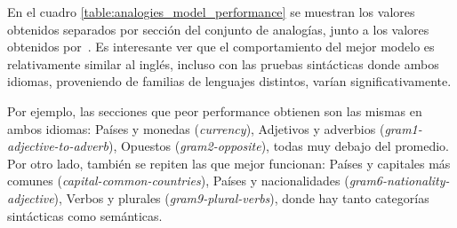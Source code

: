 En el cuadro \ref{table:analogies_model_performance} se muestran los valores obtenidos separados
por sección del conjunto de analogías, junto a los valores obtenidos por~\cite{Levy2014b}. Es
interesante ver que el comportamiento del mejor modelo es relativamente similar al inglés, incluso
con las pruebas sintácticas donde ambos idiomas, proveniendo de familias de lenguajes distintos,
varían significativamente.

Por ejemplo, las secciones que peor performance obtienen son las mismas en ambos idiomas: Países y
monedas (\textit{currency}), Adjetivos y adverbios (\textit{gram1-adjective-to-adverb}), Opuestos
(\textit{gram2-opposite}), todas muy debajo del promedio. Por otro lado, también se repiten las que
mejor funcionan: Países y capitales más comunes (\textit{capital-common-countries}), Países y
nacionalidades (\textit{gram6-nationality-adjective}), Verbos y plurales (\textit{gram9-plural-verbs}),
donde hay tanto categorías sintácticas como semánticas.

